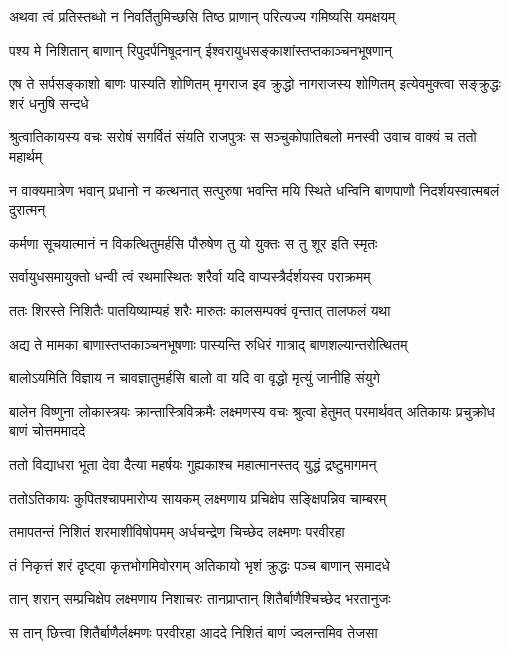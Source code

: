 \twolineshloka
{अथवा त्वं प्रतिस्तब्धो न निवर्तितुमिच्छसि}
{तिष्ठ प्राणान् परित्यज्य गमिष्यसि यमक्षयम्} %

\twolineshloka
{पश्य मे निशितान् बाणान् रिपुदर्पनिषूदनान्}
{ईश्वरायुधसङ्काशांस्तप्तकाञ्चनभूषणान्} %

\threelineshloka
{एष ते सर्पसङ्काशो बाणः पास्यति शोणितम्}
{मृगराज इव क्रुद्धो नागराजस्य शोणितम्}
{इत्येवमुक्त्वा सङ्क्रुद्धः शरं धनुषि सन्दधे} %

\twolineshloka
{श्रुत्वातिकायस्य वचः सरोषं सगर्वितं संयति राजपुत्रः}
{स सञ्चुकोपातिबलो मनस्वी उवाच वाक्यं च ततो महार्थम्} %

\twolineshloka
{न वाक्यमात्रेण भवान् प्रधानो न कत्थनात् सत्पुरुषा भवन्ति}
{मयि स्थिते धन्विनि बाणपाणौ निदर्शयस्वात्मबलं दुरात्मन्} %

\twolineshloka
{कर्मणा सूचयात्मानं न विकत्थितुमर्हसि}
{पौरुषेण तु यो युक्तः स तु शूर इति स्मृतः} %

\twolineshloka
{सर्वायुधसमायुक्तो धन्वी त्वं रथमास्थितः}
{शरैर्वा यदि वाप्यस्त्रैर्दर्शयस्व पराक्रमम्} %

\twolineshloka
{ततः शिरस्ते निशितैः पातयिष्याम्यहं शरैः}
{मारुतः कालसम्पक्वं वृन्तात् तालफलं यथा} %

\twolineshloka
{अद्य ते मामका बाणास्तप्तकाञ्चनभूषणाः}
{पास्यन्ति रुधिरं गात्राद् बाणशल्यान्तरोत्थितम्} %

\twolineshloka
{बालोऽयमिति विज्ञाय न चावज्ञातुमर्हसि}
{बालो वा यदि वा वृद्धो मृत्युं जानीहि संयुगे} %

\threelineshloka
{बालेन विष्णुना लोकास्त्रयः क्रान्तास्त्रिविक्रमैः}
{लक्ष्मणस्य वचः श्रुत्वा हेतुमत् परमार्थवत्}
{अतिकायः प्रचुक्रोध बाणं चोत्तममाददे} %

\twolineshloka
{ततो विद्याधरा भूता देवा दैत्या महर्षयः}
{गुह्यकाश्च महात्मानस्तद् युद्धं द्रष्टुमागमन्} %

\twolineshloka
{ततोऽतिकायः कुपितश्चापमारोप्य सायकम्}
{लक्ष्मणाय प्रचिक्षेप सङ्क्षिपन्निव चाम्बरम्} %

\twolineshloka
{तमापतन्तं निशितं शरमाशीविषोपमम्}
{अर्धचन्द्रेण चिच्छेद लक्ष्मणः परवीरहा} %

\twolineshloka
{तं निकृत्तं शरं दृष्ट्वा कृत्तभोगमिवोरगम्}
{अतिकायो भृशं क्रुद्धः पञ्च बाणान् समादधे} %

\twolineshloka
{तान् शरान् सम्प्रचिक्षेप लक्ष्मणाय निशाचरः}
{तानप्राप्तान् शितैर्बाणैश्चिच्छेद भरतानुजः} %

\twolineshloka
{स तान् छित्त्वा शितैर्बाणैर्लक्ष्मणः परवीरहा}
{आददे निशितं बाणं ज्वलन्तमिव तेजसा} %

